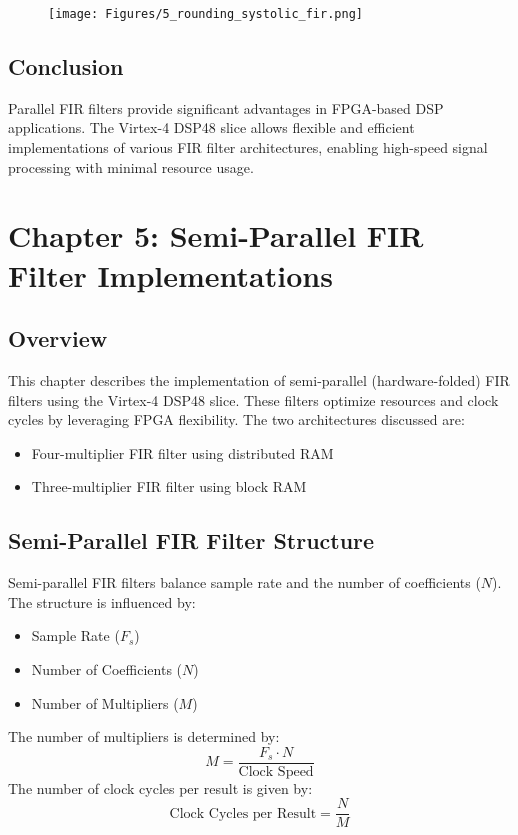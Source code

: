 \documentclass{article}
\begin{document}
	\begin{figure}
		\centering
		\texttt{[image: Figures/5\_rounding\_systolic\_fir.png]}
		\label{fig:enter-label}
	\end{figure}
	
	\subsection{Conclusion}
	Parallel FIR filters provide significant advantages in FPGA-based DSP applications. The Virtex-4 DSP48 slice allows flexible and efficient implementations of various FIR filter architectures, enabling high-speed signal processing with minimal resource usage.
	
	
	\newpage
	
	\section{Chapter 5: Semi-Parallel FIR Filter Implementations}
	\subsection{Overview}
	This chapter describes the implementation of semi-parallel (hardware-folded) FIR filters using the Virtex-4 DSP48 slice. These filters optimize resources and clock cycles by leveraging FPGA flexibility. The two architectures discussed are:
	\begin{itemize}
		\item Four-multiplier FIR filter using distributed RAM
		\item Three-multiplier FIR filter using block RAM
	\end{itemize}
	
	\subsection{Semi-Parallel FIR Filter Structure}
	Semi-parallel FIR filters balance sample rate and the number of coefficients ($N$). The structure is influenced by:
	\begin{itemize}
		\item Sample Rate ($F_s$)
		\item Number of Coefficients ($N$)
		\item Number of Multipliers ($M$)
	\end{itemize}
	The number of multipliers is determined by:
	\begin{equation}
		M = \frac{F_s \cdot N}{\text{Clock Speed}}
	\end{equation}
	The number of clock cycles per result is given by:
	\begin{equation}
		\text{Clock Cycles per Result} = \frac{N}{M}
	\end{equation}
	
\end{document}
